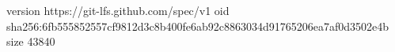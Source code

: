 version https://git-lfs.github.com/spec/v1
oid sha256:6fb555852557cf9812d3c8b400fe6ab92c8863034d91765206ea7af0d3502e4b
size 43840
